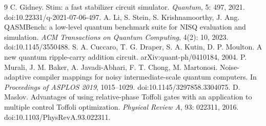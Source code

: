 \begin{thebibliography}{9}
 C. Gidney. Stim: a fast stabilizer circuit simulator. \emph{Quantum}, 5: 497, 2021. doi:10.22331/q-2021-07-06-497.
 A. Li, S. Stein, S. Krishnamoorthy, J. Ang. QASMBench: a low-level quantum benchmark suite for NISQ evaluation and simulation. \emph{ACM Transactions on Quantum Computing}, 4(2): 10, 2023. doi:10.1145/3550488.
 S. A. Cuccaro, T. G. Draper, S. A. Kutin, D. P. Moulton. A new quantum ripple-carry addition circuit. arXiv:quant-ph/0410184, 2004.
 P. Murali, J. M. Baker, A. Javadi-Abhari, F. T. Chong, M. Martonosi. Noise-adaptive compiler mappings for noisy intermediate-scale quantum computers. In \emph{Proceedings of ASPLOS 2019}, 1015--1029. doi:10.1145/3297858.3304075.
 D. Maslov. Advantages of using relative-phase Toffoli gates with an application to multiple control Toffoli optimization. \emph{Physical Review A}, 93: 022311, 2016. doi:10.1103/PhysRevA.93.022311.
\end{thebibliography}


